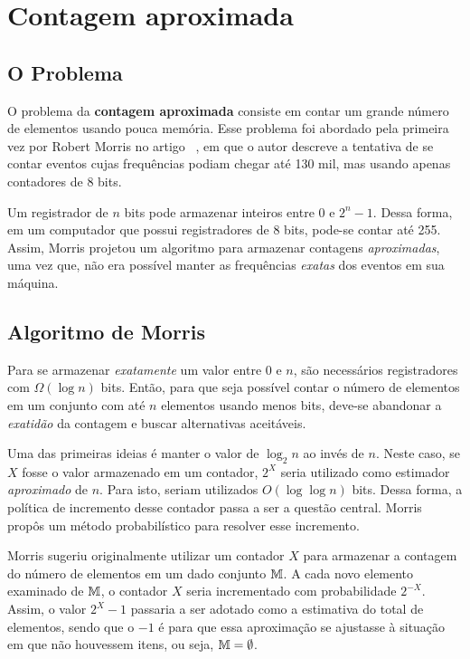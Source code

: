 \chapter{Contagem aproximada}
\label{chap:morris}


\section{O Problema}

O problema da \textbf{contagem aproximada} consiste em contar um grande número de elementos usando pouca memória.  
Esse problema foi abordado pela primeira vez por Robert  Morris no artigo ~\citep{morris:78}, 
em que o autor descreve a tentativa de se contar eventos cujas frequências podiam chegar até 130 mil, mas usando apenas contadores de 8 bits.

Um registrador de $n$ bits pode armazenar inteiros entre $0$ e $2^n-1$. 
Dessa forma, em um computador que possui registradores de 8 bits, pode-se contar até 255.
Assim, Morris projetou um algoritmo para armazenar contagens \textit{aproximadas}, 
uma vez que, não era possível manter as frequências \textit{exatas} dos eventos em sua máquina.

\section{Algoritmo de Morris}

Para se armazenar \textit{exatamente} um valor entre $0$ e $n$, são necessários registradores com $\Omega(\log n)$ bits. 
Então, para que seja possível contar o número de elementos em um conjunto com até $n$ elementos usando menos bits, 
deve-se abandonar a \textit{exatidão} da contagem e buscar alternativas aceitáveis.

Uma das primeiras ideias é manter o valor de $\log_2 n$ ao invés de $n$. 
Neste caso, se $X$ fosse o valor armazenado em um contador, $2^X$ seria utilizado como estimador \textit{aproximado} de $n$.
Para isto, seriam utilizados $O(\log \log n)$ bits.
Dessa forma, a política de incremento desse contador passa a ser a questão central.
Morris propôs um método probabilístico para resolver esse incremento.

Morris sugeriu originalmente utilizar um contador $X$ para armazenar a contagem do número de elementos em um dado conjunto $\mathbb{M}$.
A cada novo elemento examinado de $\mathbb{M}$, o contador $X$ seria incrementado com probabilidade $2^{-X}$.
Assim, o valor $2^{X} - 1$ passaria a ser adotado como a estimativa do total de elementos, 
sendo que o $-1$ é para que essa aproximação se ajustasse à situação em que não houvessem itens, ou seja, $\mathbb{M} = \emptyset$.

